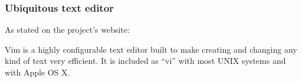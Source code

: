 \begin{frame}[fragile]
  \frametitle{Ubiquitous text editor}
  As stated on the project's website:

  \vspace{1cm}

  Vim is a highly configurable text editor built to make creating and changing
  any kind of text very efficient. It is included as ``vi'' with most UNIX
  systems and with Apple OS X.
\end{frame}
